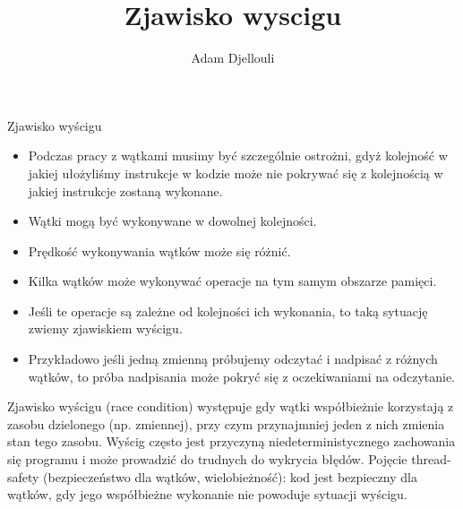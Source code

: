 \documentclass[notheorems, aspectratio=54]{beamer}
\title[Zjawisko wyscigu]{Zjawisko wyscigu}
\author{Adam Djellouli}
\begin{document}
\begin{frame}
\titlepage
\end{frame}

\begin{frame}

Zjawisko wyścigu

\begin{itemize}
\item Podczas pracy z wątkami musimy być szczególnie ostrożni, gdyż kolejność w jakiej ułożyliśmy instrukcje w kodzie może nie pokrywać się z kolejnością w jakiej instrukcje zostaną wykonane. 
\item Wątki mogą być wykonywane w dowolnej kolejności.
\item Prędkość wykonywania wątków może się różnić.
\item Kilka wątków może wykonywać operacje na tym samym obszarze pamięci.
\item Jeśli te operacje są zależne od kolejności ich wykonania, to taką sytuację zwiemy zjawiskiem wyścigu.
\item Przykładowo jeśli jedną zmienną próbujemy odczytać i nadpisać z różnych wątków, to próba nadpisania może pokryć się z oczekiwaniami na odczytanie.
\end{itemize}

Zjawisko wyścigu (race condition) występuje gdy wątki współbieżnie korzystają z zasobu dzielonego (np. zmiennej), przy czym przynajmniej jeden z nich zmienia stan tego zasobu.
Wyścig często jest przyczyną niedeterministycznego zachowania się programu i może prowadzić do trudnych do wykrycia błędów.
Pojęcie thread-safety (bezpieczeństwo dla wątków, wielobieżność): kod jest bezpieczny dla wątków, gdy jego współbieżne wykonanie nie powoduje sytuacji wyścigu. 

\end{frame}
\end{document}
